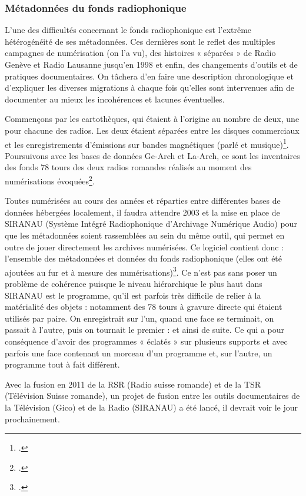 \subsubsection{Métadonnées du fonds radiophonique}

L’une des difficultés concernant le fonds radiophonique est l’extrême hétérogénéité de ses métadonnées. Ces dernières sont le reflet des multiples campagnes de numérisation (on l’a vu), des histoires « séparées » de Radio Genève et Radio Lausanne jusqu’en 1998 et enfin, des changements d’outils et de pratiques documentaires. On tâchera d’en faire une description chronologique et d’expliquer les diverses migrations à chaque fois qu’elles sont intervenues afin de documenter au mieux les incohérences et lacunes éventuelles.

Commençons par les cartothèques, qui étaient à l’origine au nombre de deux, une pour chacune des radios. Les deux étaient séparées entre les disques commerciaux et les enregistrements d’émissions sur bandes magnétiques (parlé et musique)\footcite[pp. 34-37]{prongue2009}. Poursuivons avec les bases de données Ge-Arch et La-Arch, ce sont les inventaires des fonds 78 tours des deux radios romandes réalisés au moment des numérisations évoquées\footcite[p. 33]{prongue2009}.

Toutes numérisées au cours des années et réparties entre différentes bases de données hébergées localement, il faudra attendre 2003 et la mise en place de SIRANAU (Système Intégré Radiophonique d’Archivage Numérique Audio) pour que les métadonnées soient rassemblées au sein du même outil, qui permet en outre de jouer directement les archives numérisées. Ce logiciel contient donc : l’ensemble des métadonnées et données du fonds radiophonique (elles ont été ajoutées au fur et à mesure des numérisations)\footcite[p. 37]{prongue2009}. Ce n’est pas sans poser un problème de cohérence puisque le niveau hiérarchique le plus haut dans SIRANAU est le programme, qu’il est parfois très difficile de relier à la matérialité des objets : notamment des 78 tours à gravure directe qui étaient utilisés par paire. On enregistrait sur l’un, quand une face se terminait, on passait à l’autre, puis on tournait le premier : et ainsi de suite. Ce qui a pour conséquence d’avoir des programmes « éclatés » sur plusieurs supports et avec parfois une face contenant un morceau d’un programme et, sur l’autre, un programme tout à fait différent.

Avec la fusion en 2011 de la RSR (Radio suisse romande) et de la TSR (Télévision Suisse romande), un projet de fusion entre les outils documentaires de la Télévision (Gico) et de la Radio (SIRANAU) a été lancé, il devrait voir le jour prochainement.

